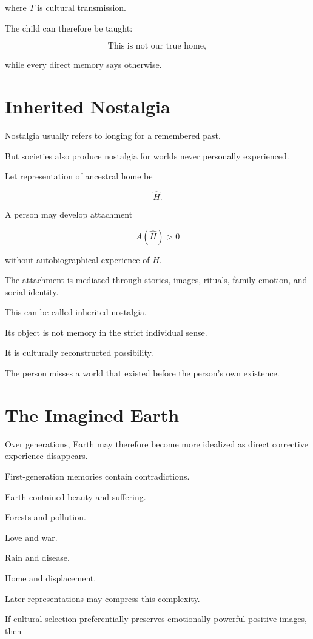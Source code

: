 \documentclass[11pt,oneside]{book}
\theoremstyle{definition}
\theoremstyle{remark}
\begin{document}
where \(T\) is cultural transmission.

The child can therefore be taught:

\[
\text{This is not our true home},
\]

while every direct memory says otherwise.

\section{Inherited Nostalgia}

Nostalgia usually refers to longing for a remembered past.

But societies also produce nostalgia for worlds never personally experienced.

Let representation of ancestral home be

\[
\hat{H}.
\]

A person may develop attachment

\[
A(\hat{H})>0
\]

without autobiographical experience of \(H\).

The attachment is mediated through stories, images, rituals, family emotion, and social identity.

This can be called inherited nostalgia.

Its object is not memory in the strict individual sense.

It is culturally reconstructed possibility.

The person misses a world that existed before the person's own existence.

\section{The Imagined Earth}

Over generations, Earth may therefore become more idealized as direct corrective experience disappears.

First-generation memories contain contradictions.

Earth contained beauty and suffering.

Forests and pollution.

Love and war.

Rain and disease.

Home and displacement.

Later representations may compress this complexity.

If cultural selection preferentially preserves emotionally powerful positive images, then
\end{document}
